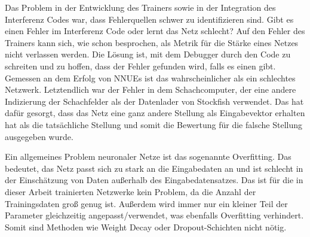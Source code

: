 Das Problem in der Entwicklung des Trainers sowie in der Integration des Interferenz Codes war, dass Fehlerquellen schwer zu identifizieren sind. Gibt es einen Fehler im Interferenz Code oder lernt das Netz schlecht? Auf den Fehler des Trainers kann sich, wie schon besprochen, als Metrik für die Stärke eines Netzes nicht verlassen werden. Die Lösung ist, mit dem Debugger durch den Code zu schreiten und zu hoffen, dass der Fehler gefunden wird, falls es einen gibt. Gemessen an dem Erfolg von \acp{NNUE} ist das wahrscheinlicher als ein schlechtes Netzwerk. Letztendlich war der Fehler in dem Schachcomputer, der eine andere Indizierung der Schachfelder als der Datenlader von Stockfish verwendet. Das hat dafür gesorgt, dass das Netz eine ganz andere Stellung als Eingabevektor erhalten hat als die tatsächliche Stellung und somit die Bewertung für die falsche Stellung ausgegeben wurde.


Ein allgemeines Problem neuronaler Netze ist das sogenannte Overfitting. Das bedeutet, das Netz passt sich zu stark an die Eingabedaten an und ist schlecht in der Einschätzung von Daten außerhalb des Eingabedatensatzes. Das ist für die in dieser Arbeit trainierten Netzwerke kein Problem, da die Anzahl der Trainingsdaten groß genug ist. Außerdem wird immer nur ein kleiner Teil der Parameter gleichzeitig angepasst/verwendet, was ebenfalls Overfitting verhindert. Somit sind Methoden wie \zb{} Weight Decay oder Dropout-Schichten nicht nötig.

